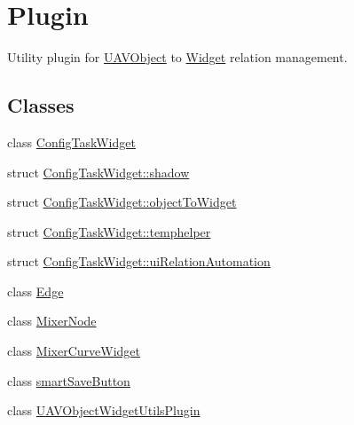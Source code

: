 \hypertarget{group___u_a_v_object_widget_utils}{\section{Plugin}
\label{group___u_a_v_object_widget_utils}
}


Utility plugin for \hyperlink{class_u_a_v_object}{U\-A\-V\-Object} to \hyperlink{class_widget}{Widget} relation management.  


\subsection*{Classes}
\begin{DoxyCompactItemize}
\item 
class \hyperlink{class_config_task_widget}{Config\-Task\-Widget}
\item 
struct \hyperlink{struct_config_task_widget_1_1shadow}{Config\-Task\-Widget\-::shadow}
\item 
struct \hyperlink{struct_config_task_widget_1_1object_to_widget}{Config\-Task\-Widget\-::object\-To\-Widget}
\item 
struct \hyperlink{struct_config_task_widget_1_1temphelper}{Config\-Task\-Widget\-::temphelper}
\item 
struct \hyperlink{struct_config_task_widget_1_1ui_relation_automation}{Config\-Task\-Widget\-::ui\-Relation\-Automation}
\item 
class \hyperlink{class_edge}{Edge}
\item 
class \hyperlink{class_mixer_node}{Mixer\-Node}
\item 
class \hyperlink{class_mixer_curve_widget}{Mixer\-Curve\-Widget}
\item 
class \hyperlink{classsmart_save_button}{smart\-Save\-Button}
\item 
class \hyperlink{class_u_a_v_object_widget_utils_plugin}{U\-A\-V\-Object\-Widget\-Utils\-Plugin}
\end{DoxyCompactItemize}
